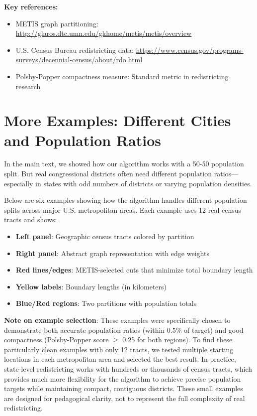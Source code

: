 \documentclass[11pt]{article}
\begin{document}
\textbf{Key references:}
\begin{itemize}
\item METIS graph partitioning: \url{http://glaros.dtc.umn.edu/gkhome/metis/metis/overview}
\item U.S. Census Bureau redistricting data: \url{https://www.census.gov/programs-surveys/decennial-census/about/rdo.html}
\item Polsby-Popper compactness measure: Standard metric in redistricting research
\end{itemize}

\clearpage
\appendix

\section{More Examples: Different Cities and Population Ratios}

In the main text, we showed how our algorithm works with a 50-50 population split. But real congressional districts often need different population ratios—especially in states with odd numbers of districts or varying population densities.

Below are six examples showing how the algorithm handles different population splits across major U.S. metropolitan areas. Each example uses 12 real census tracts and shows:

\begin{itemize}
\item \textbf{Left panel}: Geographic census tracts colored by partition
\item \textbf{Right panel}: Abstract graph representation with edge weights
\item \textbf{Red lines/edges}: METIS-selected cuts that minimize total boundary length
\item \textbf{Yellow labels}: Boundary lengths (in kilometers)
\item \textbf{Blue/Red regions}: Two partitions with population totals
\end{itemize}

\textbf{Note on example selection}: These examples were specifically chosen to demonstrate both accurate population ratios (within 0.5\% of target) and good compactness (Polsby-Popper score $\geq$ 0.25 for both regions). To find these particularly clean examples with only 12 tracts, we tested multiple starting locations in each metropolitan area and selected the best result. In practice, state-level redistricting works with hundreds or thousands of census tracts, which provides much more flexibility for the algorithm to achieve precise population targets while maintaining compact, contiguous districts. These small examples are designed for pedagogical clarity, not to represent the full complexity of real redistricting.
\end{document}
